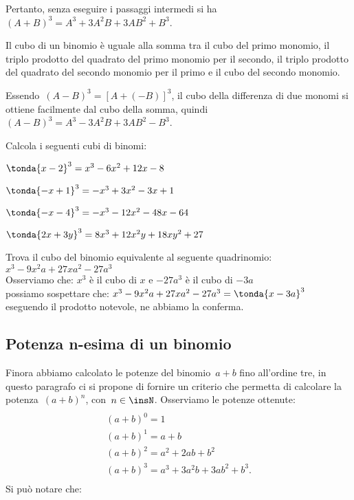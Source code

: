 Pertanto, senza eseguire i passaggi intermedi si ha
\(\left(A+B\right)^{3}=A^{3}+3A^{2}B+3{AB}^{2}+B^{3}\).

\osservazione Il cubo di un binomio è uguale alla somma tra il
cubo del primo monomio, il triplo prodotto del quadrato del primo
monomio per il secondo, il triplo prodotto del quadrato del secondo
monomio per il primo e il cubo del secondo monomio.

Essendo~\(\left(A-B\right)^{3}=\left[A+\left(-B\right)\right]^{3}\), il
cubo della differenza di due monomi si ottiene facilmente dal cubo
della somma, quindi
\(\left(A-B\right)^{3}=A^{3}-3A^{2}B+3{AB}^{2}-B^{3}\).

\begin{esempio} Calcola i seguenti cubi di binomi:
\begin{enumeratea}
\item \(\tonda{x-2}^3= x^3-6x^2+12x-8\)
\item \(\tonda{-x+1}^3= -x^3+3x^2-3x+1\)
\item \(\tonda{-x-4}^3= -x^3-12x^2-48x-64\)
\item \(\tonda{2x+3y}^3= 8x^3+12x^2y+18xy^2+27\)
\end{enumeratea}
\end{esempio}

\begin{esempio}
Trova il cubo del binomio equivalente al seguente quadrinomio:\\
\(x^3-9x^2a+27xa^2-27a^3\)\\
Osserviamo che: \(x^3\) è il cubo di \(x\) \quad 
e \quad \(-27a^3\) è il cubo di \(-3a\)\\
possiamo sospettare che: \(x^3-9x^2a+27xa^2-27a^3 = \tonda{x-3a}^3\)\\
eseguendo il prodotto notevole, ne abbiamo la conferma.
\end{esempio}


\subsection{Potenza n-esima di un binomio}
\label{subsec:11_prodnot_potenzabinomio}

Finora abbiamo calcolato le potenze del binomio~\(a+b\) fino
all'ordine tre, in questo paragrafo ci si propone di
fornire un criterio che permetta di calcolare la potenza~\((a+b)^{n}\),
con~\(n\in \insN\). Osserviamo le potenze ottenute:
\begin{multline*}
\\(a+b)^{0}=1\\
(a+b)^{1}=a+b\\
(a+b)^{2}=a^{2}+2{ab}+b^{2}\\
(a+b)^{3}=a^{3}+3a^{2}b+3{ab}^{2}+b^{3}.\\
\end{multline*}
Si può notare che:

